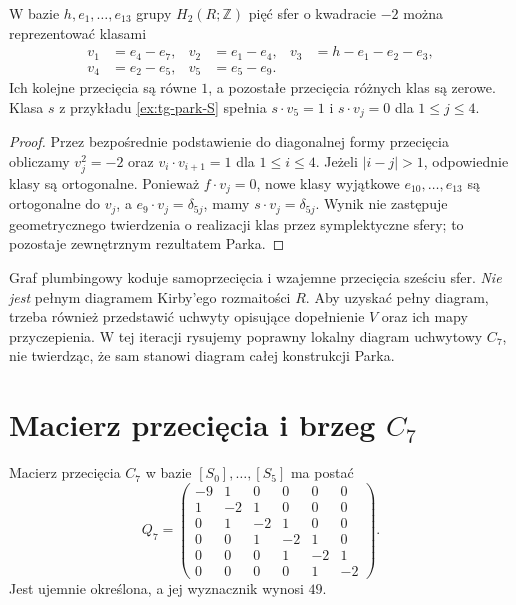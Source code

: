 \begin{lemat}
\label{lem:tg-park-S-classes}
W bazie $h,e_1,\ldots,e_{13}$ grupy $H_2(R;\mathbb Z)$
pięć sfer o kwadracie $-2$ można reprezentować klasami
\[
\begin{aligned}
 v_1&=e_4-e_7,& v_2&=e_1-e_4,&
 v_3&=h-e_1-e_2-e_3,\\
 v_4&=e_2-e_5,& v_5&=e_5-e_9.
\end{aligned}
\]
Ich kolejne przecięcia są równe $1$, a pozostałe przecięcia
różnych klas są zerowe. Klasa $s$ z przykładu
\ref{ex:tg-park-S} spełnia $s\cdot v_5=1$ i
$s\cdot v_j=0$ dla $1\le j\le4$.
\end{lemat}

\begin{proof}
Przez bezpośrednie podstawienie do diagonalnej formy przecięcia
obliczamy $v_j^2=-2$ oraz
$v_i\cdot v_{i+1}=1$ dla $1\le i\le4$.
Jeżeli $|i-j|>1$, odpowiednie klasy są ortogonalne.
Ponieważ $f\cdot v_j=0$, nowe klasy wyjątkowe
$e_{10},\ldots,e_{13}$ są ortogonalne do $v_j$, a
$e_9\cdot v_j=\delta_{5j}$, mamy
$s\cdot v_j=\delta_{5j}$.
Wynik nie zastępuje geometrycznego twierdzenia o realizacji
klas przez symplektyczne sfery; to pozostaje zewnętrznym
rezultatem Parka.
\end{proof}

\begin{uwaga}
Graf plumbingowy koduje samoprzecięcia i wzajemne
przecięcia sześciu sfer. \emph{Nie jest} pełnym diagramem
Kirby'ego rozmaitości $R$. Aby uzyskać pełny diagram,
trzeba również przedstawić uchwyty opisujące dopełnienie
$V$ oraz ich mapy przyczepienia. W tej iteracji rysujemy
poprawny lokalny diagram uchwytowy $C_7$, nie twierdząc,
że sam stanowi diagram całej konstrukcji Parka.
\end{uwaga}

\section{Macierz przecięcia i brzeg \texorpdfstring{$C_7$}{C7}}
\label{sec:tg-park-boundary}

\begin{stwierdzenie}
\label{prop:tg-park-Q}
Macierz przecięcia $C_7$ w bazie $[S_0],\ldots,[S_5]$
ma postać
\[
Q_7=\begin{pmatrix}
-9&1&0&0&0&0\\
1&-2&1&0&0&0\\
0&1&-2&1&0&0\\
0&0&1&-2&1&0\\
0&0&0&1&-2&1\\
0&0&0&0&1&-2
\end{pmatrix}.
\]
Jest ujemnie określona, a jej wyznacznik wynosi $49$.
\end{stwierdzenie}

